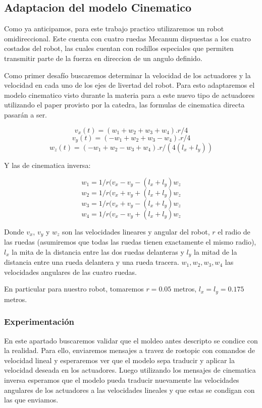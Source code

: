 \subsection{Adaptacion del modelo Cinematico}
Como ya anticipamos, para este trabajo practico utilizaremos un robot omidireccional. Este cuenta con cuatro ruedas Mecanum dispuestas a los cuatro costados del robot, las cuales cuentan con rodillos especiales que permiten transmitir parte de la fuerza en direccion de un angulo definido.

Como primer desafío buscaremos determinar la velocidad de los actuadores y la velocidad en cada uno de los ejes de livertad del robot. Para esto adaptaremos el modelo cinematico visto durante la materia para a este nuevo tipo de actuadores utilizando el paper provisto por la catedra, las formulas de cinematica directa pasarán a ser.


$$v_x(t)=(w_1+w_2+w_3+w_4).r/4$$
$$v_y(t)=(-w_1+w_2+w_3-w_4).r/4$$
$$w_z(t)=(-w_1+w_2-w_3+w_4).r/(4(l_x+l_y))$$


Y las de cinematica inversa:

$$ w_1 = 1/r (v_x - v_y - (l_x + l_y)w_z$$
$$ w_2 = 1/r (v_x + v_y + (l_x + l_y)w_z$$
$$ w_3 = 1/r (v_x + v_y - (l_x + l_y)w_z$$
$$ w_4 = 1/r (v_x - v_y + (l_x + l_y)w_z$$

Donde $v_x$, $v_y$ y $w_z$ son las velocidades lineares y angular del robot, $r$ el radio de las ruedas (asumiremos que todas las ruedas tienen exactamente el mismo radio), $l_x$ la mita de la distancia entre las dos ruedas delanteras y $l_y$ la mitad de la distancia entre una rueda delantera y una rueda tracera.
$w_1,w_2,w_3,w_4$ las velocidades angulares de las cuatro ruedas.

En particular para nuestro robot, tomaremos $r =0.05 $ metros, $l_x = l_y = 0.175 $ metros.

\subsubsection{Experimentación}

En este apartado buscaremos validar que el moldeo antes descripto se condice con la realidad. Para ello, enviaremos mensajes a travez de rostopic con comandos de velocidad lineal y esperaremos ver que el modelo sepa traducir y aplicar la velocidad deseada en los actuadores. Luego utilizando los mensajes de cinematica inversa esperamos que el modelo pueda traducir nuevamente las velocidades angulares de los actuadores a las velocidades lineales y que estas se condigan con las que enviamos.

